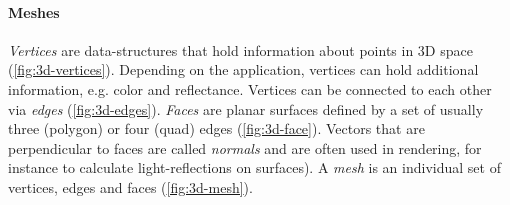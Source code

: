\paragraph{Meshes} \textit{Vertices} are data-structures that hold information about points in 3D space (\ref{fig:3d-vertices}). Depending on the application, vertices can hold additional information, e.g. color and reflectance. Vertices can be connected to each other via \textit{edges} (\ref{fig:3d-edges}). \textit{Faces} are planar surfaces defined by a set of usually three (polygon) or four (quad) edges (\ref{fig:3d-face}). Vectors that are perpendicular to faces are called \textit{normals} and are often used in rendering, for instance to calculate light-reflections on surfaces). A \textit{mesh} is an individual set of vertices, edges and faces (\ref{fig:3d-mesh}). 

